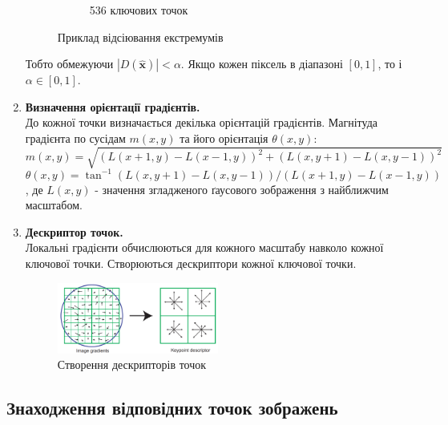 \begin{enumerate}
\begin{figure}[H]
\begin{subfigure}[c]{0.3\textwidth}
                  \caption{ 536 ключових точок
                      \label{fig:swift5}
                  }
              \end{subfigure}
              \caption{Приклад відсіювання екстремумів \cite{sift}
                  \label{fig:sift45}
              }
          \end{figure}
          Тобто обмежуючи $|D(\widehat{\textbf{x}})| < \alpha$.
          Якщо кожен піксель в діапазоні $[0,1]$, то і
          $ \alpha \in [0,1]$.
    \item \textbf{Визначення орієнтації градієнтів.} \\
          До кожної точки визначається декілька орієнтацій градієнтів.
          Магнітуда градієнта по сусідам $m(x,y)$ та його орієнтація $\theta(x,y)$:
          \begin{equation}
              m(x,y) = \sqrt{(L(x+1,y) - L(x-1,y))^2 + (L(x,y+1) - L(x,y-1))^2}
          \end{equation}
          \begin{equation}
              \theta(x,y) = \tan^{-1} (L(x,y+1) - L(x,y-1))/(L(x+1,y) - L(x-1,y))
          \end{equation}
          , де $L(x,y)$ - значення згладженого ґаусового зображення з найближчим масштабом.

    \item \textbf{Дескриптор точок.} \\
          Локальні градієнти обчислюються для кожного масштабу навколо кожної ключової точки.
          Створюються дескриптори кожної ключової точки.
          \begin{figure}[H]
              \centering
              \includegraphics[width=0.5\textwidth]{images/sift6}
              \caption{Створення дескрипторів точок \cite{sift}
                  \label{fig:swift6}
              }
          \end{figure}
\end{enumerate}

\subsection{Знаходження відповідних точок зображень}

